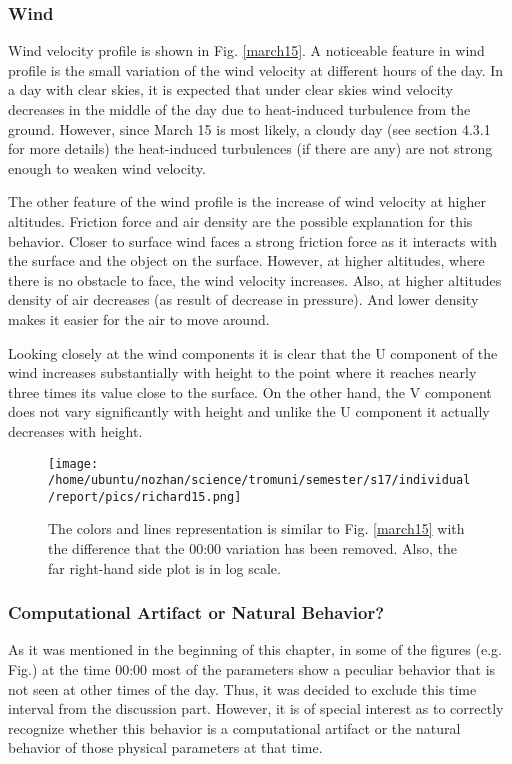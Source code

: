 \documentclass[a4paper,12pt]{article}
\numberwithin{equation}{section} %
\begin{document}
\subsubsection{Wind}

Wind velocity profile is shown in Fig. \ref{march15}. A noticeable feature in wind profile is the small variation of the wind velocity at different hours of the day. In a day with clear skies, it is expected that under clear skies wind velocity decreases in the middle of the day due to heat-induced turbulence from the ground. However, since March 15 is most likely, a cloudy day (see section 4.3.1 for more details) the heat-induced turbulences (if there are any) are not strong enough to weaken wind velocity. 

The other feature of the wind profile is the increase of wind velocity at higher altitudes. Friction force and air density are the possible explanation for this behavior. Closer to surface wind faces a strong friction force as it interacts with the surface and the object on the surface. However, at higher altitudes, where there is no obstacle to face, the wind velocity increases. Also, at higher altitudes density of air decreases (as result of decrease in pressure). And lower density makes it easier for the air to move around.

Looking closely at the wind components it is clear that the U component of the wind increases substantially with height to the point where it reaches nearly three times its value close to the surface. On the other hand, the V component does not vary significantly with height and unlike the U component it actually decreases with height.

\begin{figure}[bhp]
\texttt{[image: /home/ubuntu/nozhan/science/tromuni/semester/s17/individual/report/pics/richard15.png]}
\caption{The colors and lines representation is similar to Fig. \ref{march15} with the difference that the 00:00 variation has been removed. Also, the far right-hand side plot is in log scale.}
\label{richard15}
\end{figure}

\subsubsection{Computational Artifact or Natural Behavior?}

As it was mentioned in the beginning of this chapter, in some of the figures (e.g. Fig.) at the time 00:00 most of the parameters show a peculiar behavior that is not seen at other times of the day. Thus, it was decided to exclude this time interval from the discussion part. However, it is of special interest as to correctly recognize whether this behavior is a computational artifact or the natural behavior of those physical parameters at that time. 
\end{document}
